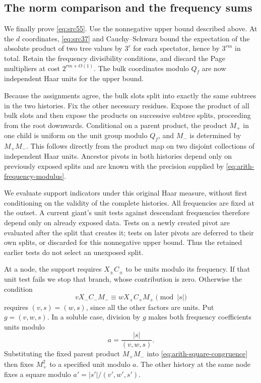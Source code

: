 \subsection{The norm comparison and the frequency sums}

We finally prove \eqref{eq:src55}. Use the nonnegative upper bound described
above. At the $d$ coordinates, \eqref{eq:src37} and Cauchy--Schwarz bound the
expectation of the absolute product of two tree values by $3^r$ for each
spectator, hence by $3^{rm}$ in total. Retain the frequency divisibility
conditions, and discard the Page multipliers at cost $2^{rm+O(1)}$. The
bulk coordinates modulo $Q_f$ are now independent Haar units for the
upper bound.

Because the assignments agree, the bulk slots split into exactly the same
subtrees in the two histories. Fix the other necessary residues. Expose the
product of all bulk slots and then expose the products on successive subtree
splits, proceeding from the root downwards. Conditional on a parent product,
the product $M_+$ in one child is uniform on the unit group modulo $Q_f$,
and $M_-$ is determined by $M_+M_-$. This follows directly from the product
map on two disjoint collections of independent Haar units. Ancestor pivots
in both histories depend only on previously exposed splits and are known
with the precision supplied by \eqref{eq:arith-frequency-modulus}.

We evaluate support indicators under this original Haar measure, without
first conditioning on the validity of the complete histories. All frequencies
are fixed at the outset. A current giant's unit tests against descendant
frequencies therefore depend only on already exposed data. Tests on a newly
created pivot are evaluated after the split that creates it; tests on later
pivots are deferred to their own splits, or discarded for this nonnegative
upper bound. Thus the retained earlier tests do not select an unexposed split.

At a node, the support requires $X_\pm C_\pm$ to be units modulo its
frequency. If that unit test fails we stop that branch, whose contribution
is zero. Otherwise the condition
\begin{equation}\label{eq:arith-square-congruence}
 vX_-C_-M_-\equiv wX_+C_+M_+\pmod{|s|}
\end{equation}
requires $(v,s)=(w,s)$, since all the other factors are units. Put
$g=(v,w,s)$. In a soluble case, division by $g$ makes both frequency
coefficients units modulo
\begin{equation}\label{eq:arith-reduced-modulus}
                                a=\frac{|s|}{(v,w,s)}.
\end{equation}
Substituting the fixed parent product $M_+M_-$ into
\eqref{eq:arith-square-congruence} then fixes $M_+^2$ to a specified unit
modulo $a$. The other history at the same node fixes a square modulo
$a'=|s'|/(v',w',s')$.

